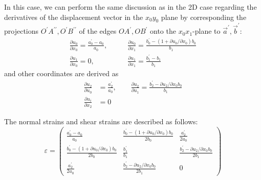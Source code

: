 \documentclass[]{article}
\theoremstyle{definition}
\newcommand{\parderiv}[2]{\frac{\partial #1}{\partial #2}}
\begin{document}
In this case, we can perform the same discussion as in the 2D case regarding the derivatives of the displacement vector in the $x_0y_0$ plane 
by corresponding the projections $O^\prime A^{\prime\prime}, O^\prime B^{\prime\prime}$ of the edges $OA^\prime, OB^\prime$ onto the $x_0x_1$-plane to $\vec{a}^\prime, \vec{b}^\prime$:
\begin{equation}
    \begin{aligned}
        \parderiv{u_0}{x_0} = \frac{a^\prime_0-a_0}{a_0},&\qquad\parderiv{u_0}{x_1} = \frac{b^\prime_0-(1 + \partial u_0/\partial x_0) b_0}{b_1}\\
        \parderiv{u_1}{x_0} = 0,&\qquad\parderiv{u_1}{x_1} = \frac{b^\prime_1 - b_1}{b_1}
    \end{aligned}
\end{equation}
and other coordinates are derived as
\begin{equation}
    \begin{aligned}
        \parderiv{u_2}{u_0} &= \frac{a_2^\prime}{a_0}, \qquad \parderiv{u_2}{u_1} = \frac{b_2^\prime - \partial u_2/\partial x_0 b_0}{b_1}\\
        \parderiv{u_i}{x_2} &= 0            
    \end{aligned}
\end{equation}

The normal strains and shear strains are described as follows:
\begin{equation}
    \mathbb{\varepsilon} = 
    \begin{pmatrix}
        \frac{a_0^\prime-a_0}{a_0} & \frac{b_0^\prime-(1+\partial u_0/\partial x_0)b_0}{2b_0} & \frac{a_2^\prime}{2a_0} \\
        \frac{b_0^\prime-(1+\partial u_0/\partial x_0)b_0}{2b_0} & \frac{b_1^\prime}{b_1} & \frac{b_2^\prime - \partial u_2/\partial x_0 b_0}{2b_1}\\
        \frac{a_2^\prime}{2a_0} &  \frac{b_2^\prime - \partial u_2/\partial x_0 b_0}{2b_1} & 0
    \end{pmatrix}
\end{equation}
\end{document}
